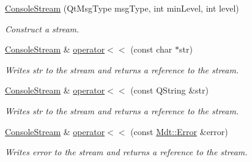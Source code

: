 \begin{DoxyCompactItemize}
\item 
\hyperlink{class_mdt_1_1_deploy_utils_1_1_console_stream_aa2df420c51b0524d143b4e877293f248}{Console\+Stream} (Qt\+Msg\+Type msg\+Type, int min\+Level, int level)\hypertarget{class_mdt_1_1_deploy_utils_1_1_console_stream_aa2df420c51b0524d143b4e877293f248}{}\label{class_mdt_1_1_deploy_utils_1_1_console_stream_aa2df420c51b0524d143b4e877293f248}

\begin{DoxyCompactList}\small\item\em Construct a stream. \end{DoxyCompactList}\item 
\hyperlink{class_mdt_1_1_deploy_utils_1_1_console_stream}{Console\+Stream} \& \hyperlink{class_mdt_1_1_deploy_utils_1_1_console_stream_a9fd2ecfe4311b0cdd3b9536f24314af7}{operator$<$$<$} (const char $\ast$str)\hypertarget{class_mdt_1_1_deploy_utils_1_1_console_stream_a9fd2ecfe4311b0cdd3b9536f24314af7}{}\label{class_mdt_1_1_deploy_utils_1_1_console_stream_a9fd2ecfe4311b0cdd3b9536f24314af7}

\begin{DoxyCompactList}\small\item\em Writes {\itshape str} to the stream and returns a reference to the stream. \end{DoxyCompactList}\item 
\hyperlink{class_mdt_1_1_deploy_utils_1_1_console_stream}{Console\+Stream} \& \hyperlink{class_mdt_1_1_deploy_utils_1_1_console_stream_aebf5221a69df6dfb11c0a0c666e00653}{operator$<$$<$} (const Q\+String \&str)\hypertarget{class_mdt_1_1_deploy_utils_1_1_console_stream_aebf5221a69df6dfb11c0a0c666e00653}{}\label{class_mdt_1_1_deploy_utils_1_1_console_stream_aebf5221a69df6dfb11c0a0c666e00653}

\begin{DoxyCompactList}\small\item\em Writes {\itshape str} to the stream and returns a reference to the stream. \end{DoxyCompactList}\item 
\hyperlink{class_mdt_1_1_deploy_utils_1_1_console_stream}{Console\+Stream} \& \hyperlink{class_mdt_1_1_deploy_utils_1_1_console_stream_ae8b85dd69639169c3e60002a42f38236}{operator$<$$<$} (const \hyperlink{class_mdt_1_1_error}{Mdt\+::\+Error} \&error)\hypertarget{class_mdt_1_1_deploy_utils_1_1_console_stream_ae8b85dd69639169c3e60002a42f38236}{}\label{class_mdt_1_1_deploy_utils_1_1_console_stream_ae8b85dd69639169c3e60002a42f38236}

\begin{DoxyCompactList}\small\item\em Writes {\itshape error} to the stream and returns a reference to the stream. \end{DoxyCompactList}\end{DoxyCompactItemize}


